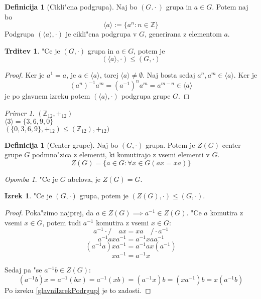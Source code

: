 \documentclass[11pt, a4paper]{article}
\theoremstyle{definition}
\newtheorem{defn}[counter]{Definicija}
\newtheorem{claim}[counter]{Trditev}
\newtheorem{theorem}[counter]{Izrek}
\theoremstyle{remark}
\newtheorem*{ex}{Primer}
\newtheorem*{rem}{Opomba}
\newcommand{\Z}{\mathbb{Z}}
\begin{document}
	\begin{defn}[Cikli"cna podgrupa]\label{ciklicna_podgrupa}
		Naj bo $(G. \cdot)$ grupa in $a \in G$. Potem naj bo
		\[ \langle a \rangle := \lbrace a^n: n \in \Z \rbrace \]
		Podgrupa $(\langle a \rangle, \cdot)$ je cikli"cna podgrupa v $G$, generirana z elementom $a$.
	\end{defn}
	\begin{claim}
		"Ce je $(G, \cdot)$ grupa in $a \in G$, potem je
		\[ (\langle a \rangle, \cdot) \leq (G, \cdot) \]
	\end{claim}
	\begin{proof}
		Ker je $a^1 = a$, je $a \in \langle a \rangle$, torej $\langle a \rangle \neq \emptyset$. Naj bosta sedaj $a^n, a^m \in \langle a \rangle$.
		Ker je \[(a^n)^{-1}a^m = (a^{-1})^na^m = a^{m-n} \in \langle a \rangle \]
		je po glavnem izreku potem $(\langle a \rangle, \cdot)$ podgrupa grupe $G$.
	\end{proof}

	\begin{ex}
		$(\Z_{12}, +_{12})$
		\\
		$\langle 3 \rangle = \lbrace 3, 6, 9, 0 \rbrace$
		\\
		$(\lbrace 0, 3, 6, 9 \rbrace, +_{12}) \leq (\Z_{12}), +_{12})$
	\end{ex}

	\begin{defn}[Center grupe]
		Naj bo $(G, \cdot)$ grupa. Potem je $Z(G)$ center grupe $G$ podmno"zica z elementi, ki komutirajo z vsemi elementi v $G$.
		\[ Z(G) = \lbrace a \in G: \forall x \in G(ax=xa) \rbrace \]
	\end{defn}

	\begin{rem}
		"Ce je $G$ abelova, je $Z(G) = G$.
	\end{rem}
	\begin{theorem}
		"Ce je $(G, \cdot)$ grupa, potem je $(Z(G), \cdot) \leq (G, \cdot)$.
	\end{theorem}
	\begin{proof}		
		Poka"zimo najprej, da $a \in Z(G) \implies a^{-1} \in Z(G)$. "Ce $a$ komutira z vsemi $x \in G$, potem tudi $a^{-1}$ komutira z vsemi $x \in G$:
		\[ a^{-1} \cdot / \quad ax = xa \quad / \cdot a^{-1} \]
		\[ a^{-1}axa^{-1} = a^{-1}xaa^{-1} \]
		\[ (a^{-1}a)xa^{-1} = a^{-1}ax(a^{-1}) \]
		\[ xa^{-1} = a^{-1}x \]
		
		Sedaj pa "se $a^{-1}b \in Z(G)$:
		\[ (a^{-1}b)x = a^{-1}(bx) = a^{-1}(xb) = (a^{-1}x)b = (xa^{-1})b = x(a^{-1}b) \]
		Po izreku \ref{glavniIzrekPodrgup} je to zadosti.
	\end{proof}
\end{document}
